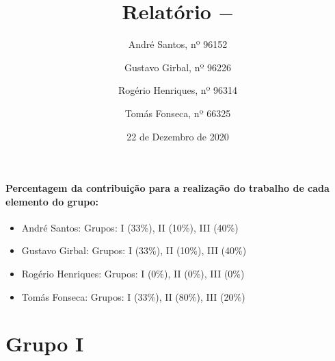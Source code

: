 \documentclass[a4paper,10pt]{extarticle}
\date{22 de Dezembro de 2020}
\begin{document}
\title{Relatório $-$ 
}
\author{ André Santos, nº 96152 \and Gustavo Girbal, nº 96226 \and Rogério Henriques, nº 96314 \and Tomás Fonseca, nº 66325}
\maketitle

\paragraph{Percentagem da contribuição para a realização do trabalho de cada elemento do grupo:}
\begin{itemize}
\item André Santos: Grupos: I (33\%), II (10\%), III (40\%)
\item Gustavo Girbal: Grupos: I (33\%), II (10\%), III (40\%)
\item Rogério Henriques: Grupos: I (0\%), II (0\%), III (0\%)
\item Tomás Fonseca: Grupos: I (33\%), II (80\%), III (20\%)
\end{itemize}

\section*{Grupo I}
\end{document}
